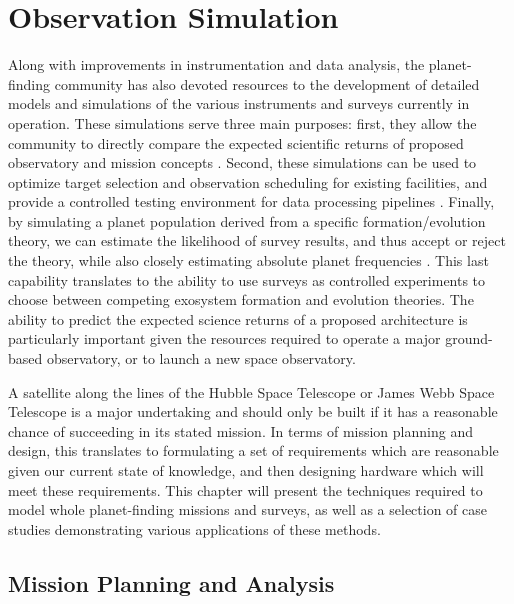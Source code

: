 \chapter{Observation Simulation}\label{ch:obs_sims}

Along with improvements in instrumentation and data analysis, the planet-finding community has also devoted resources to the development of detailed models and simulations of the various instruments and surveys currently in operation.  These simulations serve three main purposes:  first, they allow the community to directly compare the expected scientific returns of proposed observatory and mission concepts \citep{savransky2010}.  Second, these simulations can be used to optimize target selection and observation scheduling for existing facilities, and provide a controlled testing environment for data processing pipelines \citep{bryson2010kepler}. Finally, by simulating a planet population derived from a specific formation/evolution theory, we can estimate the likelihood of survey results, and thus accept or reject the theory, while also closely estimating absolute planet frequencies \citep{gould2010frequency}.  This last capability translates to the ability to use surveys as controlled experiments to choose between competing exosystem formation and evolution theories.  The ability to predict the expected science returns of a proposed architecture is particularly important given the resources required to operate a major ground-based observatory, or to launch a new space observatory.  

A satellite along the lines of the Hubble Space Telescope or James Webb Space Telescope is a major undertaking and should only be built if it has a reasonable chance of succeeding in its stated mission.  In terms of mission planning and design, this translates to formulating a set of requirements which are reasonable given our current state of knowledge, and then designing hardware which will meet these requirements.  This chapter will present the techniques required to model whole planet-finding missions and surveys, as well as a selection of case studies demonstrating various applications of these methods.

\section{Mission Planning and Analysis}\label{sec:ch4_intro}

